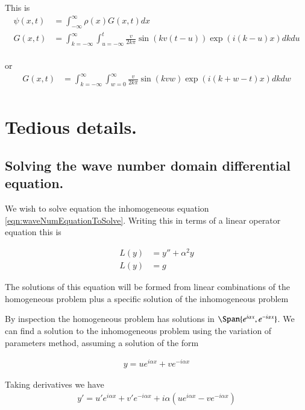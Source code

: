 \documentclass{article}
\newcommand{\IIinf}[0]{ \int_{-\infty}^\infty }
\begin{document}
This is
\begin{align*}
{\psi}(x, t) 
&= 
\IIinf {\rho}(x) G( x, t ) dx \\
G(x, t) &=
\int_{k=-\infty}^\infty
\int_{u = -\infty}^t 
\frac{v}{2 k \pi}
\sin( k v (t-u) ) 
\exp( i (k-u) x ) 
dk 
du 
\\
\end{align*}

or
\begin{align*}
G(x, t) &=
\int_{k=-\infty}^\infty
\int_{w = 0}^{\infty}
\frac{v}{2 k \pi}
\sin( k v w ) 
\exp( i (k+w-t) x ) 
dk 
dw 
\\
\end{align*}

\section{ Tedious details. }

\subsection{ Solving the wave number domain differential equation. }

We wish to solve equation the inhomogeneous equation \ref{eqn:waveNumEquationToSolve}.  Writing this in terms of a linear operator equation this is

\begin{align*}
L(y) &= y'' + \alpha^2 y \\
L(y) &= g
\end{align*}

The solutions of this equation will be formed from linear combinations of the homogeneous problem plus a specific solution of the inhomogeneous problem

By inspection the homogeneous problem has solutions in $\Span \{ e^{ i \alpha x }, e^{ -i \alpha x }\}$.
We can find a solution to the inhomogeneous problem using the variation of parameters method, assuming a solution of the form

\begin{align*}
y  = u e^{ i \alpha x } + v e^{ -i \alpha x } 
\end{align*}

Taking derivatives we have
\begin{align*}
y' = u' e^{ i \alpha x } + v' e^{ -i \alpha x } + i \alpha (u e^{ i \alpha x } - v e^{ -i \alpha x })
\end{align*}
\end{document}
